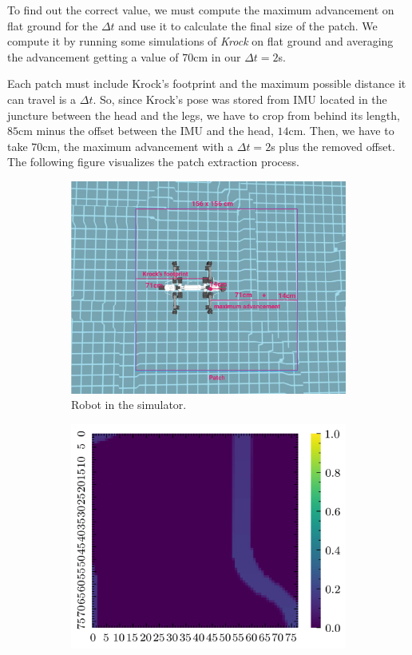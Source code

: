\documentclass[../document.tex]{subfiles}
\begin{document}
To find out the correct value, we must compute the maximum advancement on flat ground for the $\Delta t$ and use it to calculate the final size of the patch. We compute it by running some simulations of \emph{Krock} on flat ground and averaging the advancement getting a value of $70$cm in our $\Delta t = 2$s.

Each patch must include Krock's footprint and the maximum possible distance it can travel is a $\Delta t$. So, since Krock's pose was stored from IMU located in the juncture between the head and the legs, we have to crop from behind its length, $85$cm minus the offset between the IMU and the head, $14$cm. Then, we have to take $70$cm, the maximum advancement with a $\Delta t = 2$s plus the removed offset. The following figure visualizes the patch extraction process. 
\begin{figure}[htbp]
    \centering
    \begin{subfigure}[b]{0.66\textwidth}
        \includegraphics[width=\textwidth]{../img/3/crop/crop.png}
        \caption{Robot in the simulator.}
    \end{subfigure}
    \begin{subfigure}[b]{0.45\textwidth}
        \includegraphics[width=\textwidth]{../img/3/crop/test-1-2d.png}

\end{subfigure}
\end{figure}
\end{document}
